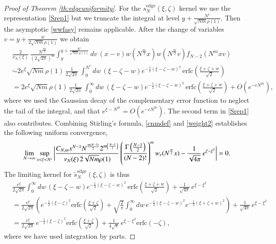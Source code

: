 \documentclass[11pt,reqno]{amsproc}
\numberwithin{equation}{section}
\numberwithin{theorem}{section}
\begin{document}
\begin{proof}[Proof of Theorem \ref{th:edgeuniformity}]
For the $s^{\mathrm{edge}}_{N}(\xi,\zeta)$ kernel we use the representation \eqref{Srep1} but we truncate the integral at level $y+\frac{N^{\epsilon}}{\sqrt{Nm}\rho(1)}$. Then the asymptotic \eqref{wwfasy} remains applicable. After the change of variables $v = y+\frac{w}{2\sqrt{Nm}\rho(1)}$ we obtain
\begin{equation}
\begin{split}
&\frac{2}{\nu_{N}(\xi)}\,\frac{N^{\frac{3m}{2}}}{(2\sqrt{2\pi})^{m}}\int_{y}^{y+\frac{N^{\epsilon}}{\sqrt{Nm}\rho(1)}}dv\,(x-v)w(N^{\frac{m}{2}}x)w(N^{\frac{m}{2}}v)f_{N-2}(N^{m}xv)\\
&\sim 2e^{\xi}\sqrt{Nm}\rho(1)\,\frac{1}{2\sqrt{2\pi}}\,\int_{0}^{N^{\epsilon}}dw\,(\xi-\zeta-w)e^{-\frac{1}{2}(\xi-\zeta-w)^{2}}\,\mathrm{erfc}\left(\frac{\xi+\zeta+w}{\sqrt{2}}\right)\\
&= 2e^{\xi}\sqrt{Nm}\rho(1)\,\frac{1}{2\sqrt{2\pi}}\,\int_{0}^{\infty}dw\,(\xi-\zeta-w)e^{-\frac{1}{2}(\xi-\zeta-w)^{2}}\,\mathrm{erfc}\left(\frac{\xi+\zeta+w}{\sqrt{2}}\right)+O(e^{-cN^{2\epsilon}}),
\label{truncateint}
\end{split}
\end{equation}
where we used the Gaussian decay of the complementary error function to neglect the tail of the integral, and that $e^{\xi-N^{2\epsilon}} = O(e^{-cN^{2\epsilon}})$. The second term in \eqref{Srep1} also contributes. Combining Stirling's formula, \eqref{cnmdef} and \eqref{weight2} establishes the following uniform convergence,
\begin{equation}
\lim_{N \to \infty}\sup_{s < \xi < N^{\epsilon}}\bigg{|}\frac{C_{N,m}x^{N-1}N^{\frac{m(N-3)}{2}}2^{m\left(\frac{N-1}{2}\right)}}{\nu_{N}(\xi)\,2\sqrt{Nm}\rho(1)}\left(\frac{\Gamma\left(\frac{N-1}{2}\right)}{(N-2)!}\right)^{m}w_{r}(N^{\frac{m}{2}}x)-\frac{1}{\sqrt{4\pi}}\,e^{\xi-\xi^{2}}\bigg{|}=0. \label{unifxiterm}
\end{equation}
The limiting kernel for $\tilde{s}_{N}^{\mathrm{edge}}(\xi,\zeta)$ is thus
\begin{equation}
\begin{split}
&\frac{e^{\xi}}{2\sqrt{2\pi}}\int_{0}^{\infty}dw\,(\xi-\zeta-w)e^{-\frac{1}{2}(\xi-\zeta-w)^{2}}\,\mathrm{erfc}\left(\frac{\xi+\zeta+w}{\sqrt{2}}\right)+\frac{1}{\sqrt{4\pi}}\,e^{\xi-\xi^{2}}\\
&=\frac{e^{\xi}}{2\sqrt{2\pi}}\left(e^{-\frac{1}{2}(\xi-\zeta)^{2}}\mathrm{erfc}\left(\frac{\xi+\zeta}{\sqrt{2}}\right)+\sqrt{\frac{2}{\pi}}\int_{0}^{\infty}dw\,e^{-\frac{1}{2}(\xi-\zeta-w)^{2}}e^{-\frac{1}{2}(\xi+\zeta+w)^{2}}\right)+ \frac{1}{\sqrt{4\pi}}\,e^{\xi-\xi^{2}}\\
&= \frac{e^{\xi}}{2\sqrt{2\pi}}\,e^{-\frac{1}{2}(\xi-\zeta)^{2}}\mathrm{erfc}\left(\frac{\xi+\zeta}{\sqrt{2}}\right)+\frac{1}{4\sqrt{\pi}}\,e^{\xi-\xi^{2}}\mathrm{erfc}(-\zeta), \label{limitkernalt}
\end{split}
\end{equation}
where we have used integration by parts. 


\end{proof}
\end{document}
